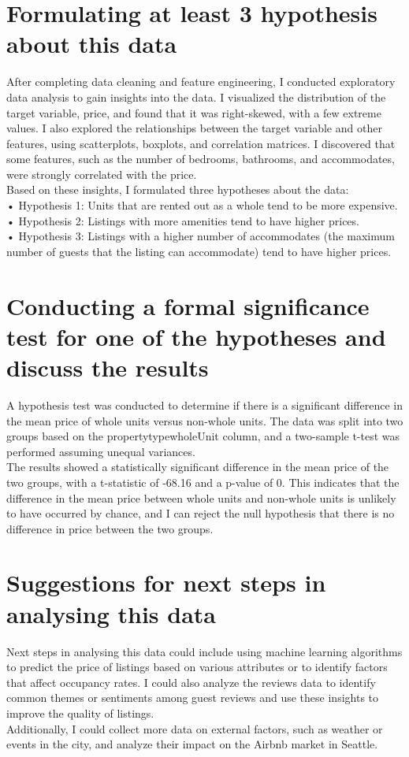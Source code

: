 \documentclass{article}
\begin{document}
\section{Formulating at least 3 hypothesis about this data}
After completing data cleaning and feature engineering, I conducted exploratory data analysis to gain insights into the data. I visualized the distribution of the target variable, price, and found that it was right-skewed, with a few extreme values. I also explored the relationships between the target variable and other features, using scatterplots, boxplots, and correlation matrices. I discovered that some features, such as the number of bedrooms, bathrooms, and accommodates, were strongly correlated with the price.\\
Based on these insights, I formulated three hypotheses about the data:\\
• Hypothesis 1: Units that are rented out as a whole tend to be more expensive.\\
• Hypothesis 2: Listings with more amenities tend to have higher prices.\\
• Hypothesis 3: Listings with a higher number of accommodates (the maximum number of guests that the listing can accommodate) tend to have higher prices.\\

\section{Conducting a formal significance test for one of the hypotheses and discuss the results}
A hypothesis test was conducted to determine if there is a significant difference in the mean price of whole units versus non-whole units. The data was split into two groups based on the property\textunderscore type\textunderscore wholeUnit column, and a two-sample t-test was performed assuming unequal variances.\\ 
The results showed a statistically significant difference in the mean price of the two groups, with a t-statistic of -68.16 and a p-value of 0. This indicates that the difference in the mean price between whole units and non-whole units is unlikely to have occurred by chance, and I can reject the null hypothesis that there is no difference in price between the two groups.\\ 

\section{Suggestions for next steps in analysing this data}
Next steps in analysing this data could include using machine learning algorithms to predict the price of listings based on various attributes or to identify factors that affect occupancy rates. I could also analyze the reviews data to identify common themes or sentiments among guest reviews and use these insights to improve the quality of listings.\\ Additionally, I could collect more data on external factors, such as weather or events in the city, and analyze their impact on the Airbnb market in Seattle.
\end{document}
